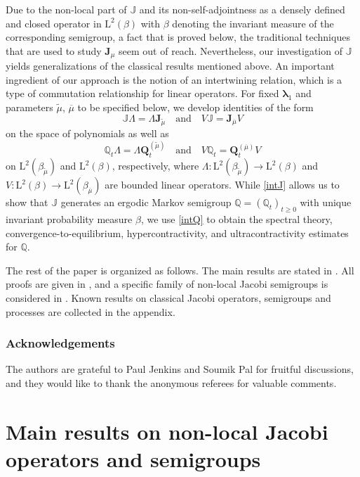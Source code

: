 \documentclass[JEP,XML,SOM,Unicode]{cedram}
\theoremstyle{plain}
\theoremstyle{definition}
\newcommand{\J}{\mathds{Q}}
\newcommand{\calJ}{\mathds{J}}
\newcommand{\Leb}{\mathrm{L}}
\newcommand{\calJd}{\mathbf{J}}
\newcommand{\lam}{{\bm{\lambda}_1}}
\newcommand{\Q}[1][\mo]{\mathbf{Q}^{({#1})}}
\newcommand{\gab}[1][\lam,\mo]{{\beta_{#1}}}
\let\mo\mu
\let\bpsi\beta
\begin{document}
Due to the non-local part of $\calJ$ and its non-self-adjointness as a densely defined and closed operator in $\Leb^2(\bpsi)$ with $\bpsi$ denoting the invariant measure of the corresponding semigroup, a fact that is proved below, the traditional techniques that are used to study $\calJd_\mo$ seem out of reach. Nevertheless, our investigation of $\calJ$ yields generalizations of the
classical results mentioned above. An important ingredient of our approach is the notion of an intertwining relation, which is a type of commutation relationship for linear operators. For fixed $\lam$ and parameters $\widetilde{\mo}$, $\overline{\mo}$ to be specified below, we develop identities of the form
\begin{equation} \label{intJ}
\calJ \Lambda = \Lambda \calJd_{\widetilde{\mo}} \quad \mbox{and} \quad V \calJ = \calJd_{\overline{\mo}} V
\end{equation}
on the space of polynomials as well as
\begin{equation} \label{intQ}
\J_t \Lambda = \Lambda \Q[\widetilde{\mo}]_t \quad \mbox{and} \quad V\J_t = \Q[\overline{\mo}]_t V
\end{equation}
on $\Leb^2(\gab[\widetilde{\mo}])$ and $\Leb^2(\bpsi)$, respectively, where $\Lambda:\Leb^2(\gab[\widetilde{\mo}]) \to \Leb^2(\bpsi)$ and $V:\Leb^2(\bpsi) \to \Leb^2(\gab[\overline{\mo}])$ are bounded linear operators.
While \eqref{intJ} allows us to show that $\calJ$ generates an ergodic Markov semigroup $\J = (\J_t)_{t \geq 0}$
with unique invariant probability measure $\bpsi$, we use \eqref{intQ} to obtain
the spectral theory, convergence-to-equilibrium, hypercontractivity, and ultracontractivity estimates for $\J$.

The rest of the paper is organized as follows. The main results are stated in . All proofs are given in , and a specific family of non-local Jacobi semigroups is considered in .
Known results on classical Jacobi operators, semigroups and processes are collected in the appendix.

\subsubsection*{Acknowledgements}
The authors are grateful to Paul Jenkins and Soumik Pal for fruitful discussions, and they would like to thank the anonymous referees for valuable comments.

\section{Main results on non-local Jacobi operators and semigroups} \label{sec:main-results}
\end{document}
